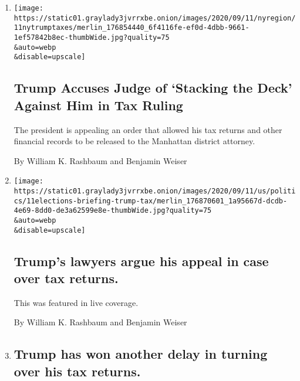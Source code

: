 \begin{enumerate}
\def\labelenumi{\arabic{enumi}.}
\item
  \href{/2020/09/11/nyregion/donald-trump-taxes-cyrus-vance.html}{}

  \texttt{[image: https://static01.graylady3jvrrxbe.onion/images/2020/09/11/nyregion/11nytrumptaxes/merlin\_176854440\_6f4116fe-ef0d-4dbb-9661-1ef57842b8ec-thumbWide.jpg?quality=75\\\&auto=webp\\\&disable=upscale]}

  \hypertarget{trump-accuses-judge-of-stacking-the-deck-against-him-in-tax-ruling}{%
  \subsection{Trump Accuses Judge of `Stacking the Deck' Against Him in
  Tax
  Ruling}\label{trump-accuses-judge-of-stacking-the-deck-against-him-in-tax-ruling}}

  The president is appealing an order that allowed his tax returns and
  other financial records to be released to the Manhattan district
  attorney.

  By William K. Rashbaum and Benjamin Weiser
\item
  \href{/live/2020/09/11/us/trump-vs-biden/trumps-lawyers-argue-his-appeal-in-case-over-tax-returns}{}

  \texttt{[image: https://static01.graylady3jvrrxbe.onion/images/2020/09/11/us/politics/11elections-briefing-trump-tax/merlin\_176870601\_1a95667d-dcdb-4e69-8dd0-de3a62599e8e-thumbWide.jpg?quality=75\\\&auto=webp\\\&disable=upscale]}

  \hypertarget{trumps-lawyers-argue-his-appeal-in-case-over-tax-returns}{%
  \subsection{Trump's lawyers argue his appeal in case over tax
  returns.}\label{trumps-lawyers-argue-his-appeal-in-case-over-tax-returns}}

  This was featured in live coverage.

  By William K. Rashbaum and Benjamin Weiser
\item
  \href{/live/2020/09/01/us/trump-vs-biden/trump-has-won-another-delay-in-turning-over-his-tax-returns}{}

  \hypertarget{trump-has-won-another-delay-in-turning-over-his-tax-returns}{%
  \subsection{Trump has won another delay in turning over his tax
  returns.}\label{trump-has-won-another-delay-in-turning-over-his-tax-returns}}


\end{enumerate}
